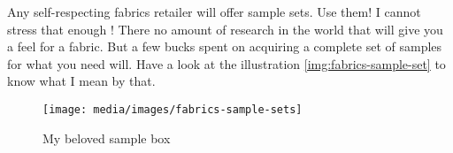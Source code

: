 Any self-respecting fabrics retailer will offer sample sets. Use them! I cannot stress that enough ! There no amount of research in the world that will give you a feel for a fabric. But a few bucks spent on acquiring a complete set of samples for what you need will. Have a look at the illustration \ref{img:fabrics-sample-set} to know what I mean by that.

\begin{figure}[H]
  \texttt{[image: media/images/fabrics-sample-sets]}
  \caption{My beloved sample box}
  \label{img:fabrics-sample-sets}
\end{figure}
